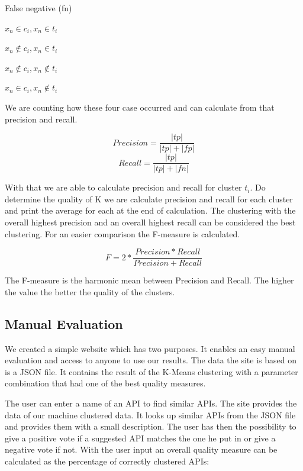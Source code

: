 \documentclass[a4paper]{IEEEtran}
\begin{document}
\begin{labeling}{False negative (fn)}
\centering \item  [True positive (tp)] $x_n \in c_i,x_n \in t_i$
\item [False positive (fp)] $x_n \notin c_i,x_n \in t_i$
\item [True negative (tn)] $x_n \notin c_i,x_n \notin t_i$
\item [False negative (fn)] $x_n \in c_i,x_n \notin t_i$
\end{labeling}

We are counting how these four case occurred and can calculate from that precision and recall. 

\begin{equation*}
Precision= \frac{|tp|}{|tp|+|fp|}
\end{equation*}
\begin{equation*}
Recall= \frac{|tp|}{|tp|+|fn|}
\end{equation*}

With that we are able to calculate precision and recall for cluster $t_i$. Do determine the quality of K we are calculate precision and recall for each cluster and print the average for each at the end of calculation. The clustering with the overall highest precision and an overall highest recall can be considered the best clustering. For an easier comparison the F-measure is calculated. 

\begin{equation*}
F=2* \frac{Precision*Recall}{Precision+Recall}
\end{equation*}

The F-measure is the harmonic mean between Precision and Recall. The higher the value the better the quality of the clusters.

\subsection{Manual Evaluation}
We created a simple website which has two purposes. It enables an easy manual evaluation and access to anyone to use our results. The data the site is based on is a JSON file. It contains the result of the K-Means clustering with a parameter combination that had one of the best quality measures.

The user can enter a name of an API to find similar APIs. The site provides the data of our machine clustered data. It looks up similar APIs from the JSON file and provides them with a small description. The user has then the possibility to give a positive vote if a suggested API matches the one he put in or give a negative vote if not.
With the user input an overall quality measure can be calculated as the percentage of correctly clustered APIs:
\end{document}
